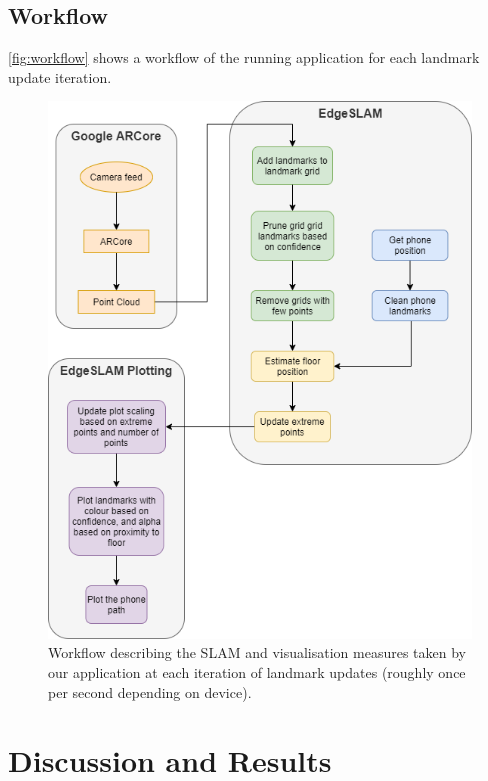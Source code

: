 \documentclass{article}
\begin{document}
\subsection{Workflow} \label{workflow}
\autoref{fig:workflow} shows a workflow of the running application for each landmark update iteration.
\begin{figure}[!htb]
    \centering
    \includegraphics[width=0.9\linewidth]{EdgeSLAM Workflow Diagran.png}
    \caption{Workflow describing the SLAM and visualisation measures taken by our application at each iteration of landmark updates (roughly once per second depending on device).}
    \label{fig:workflow}
\end{figure}

\clearpage

\section{Discussion and Results}
\end{document}
